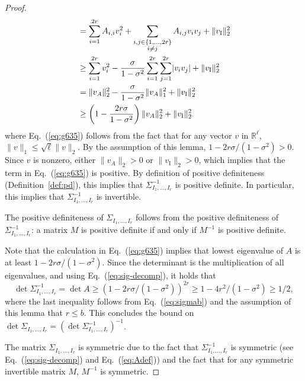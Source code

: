 \documentclass[final, 12pt]{colt2018}
\renewcommand{\eqref}[1]{Eq.~(\ref{#1})}
\begin{document}
\begin{proof}
\begin{align}
&=\sum_{i=1}^{2r} A_{i,i} v_i^2 + \sum_{\substack {i,j \in \{1,\dots,2r\} \\ i \ne j}} A_{i,j} v_i v_j + \lVert v_{\mathrm{I}} \rVert_2^2 \notag \\
&\ge \sum_{i=1}^{2r} v_i^2 - \frac{\sigma}{1-\sigma^2}\sum_{i=1}^{2r} \sum_{j=1}^{2r} \lvert v_i v_j \rvert + \lVert v_{\mathrm{I}} \rVert_2^2 \notag \\
&= \lVert v_A \rVert_2^2 - \frac{\sigma}{1-\sigma^2} \lVert v_A \rVert_1^2 + \lVert v_{\mathrm{I}} \rVert_2^2 \notag \\
&\ge \left(1 - \frac{2r \sigma}{1-\sigma^2} \right) \lVert v_A \rVert_2^2+ \lVert v_{\mathrm{I}} \rVert_2^2 \label{eq:g635} 
\end{align}
where \eqref{eq:g635} follows from the fact that for any vector $v$ in $\mathbb{R}^\ell$, $\lVert v \rVert_1 \le \sqrt{\ell} \lVert v \rVert_2$. By the assumption of this lemma, $1 - 2 r \sigma / (1-\sigma^2) > 0$. Since $v$ is nonzero, either $\lVert v_A \rVert_2 > 0$ or $\lVert v_{\mathrm{I}} \rVert_2 >0$, which implies that the term in \eqref{eq:g635} is positive. By definition of positive definiteness (Definition~\ref{def:pd}), this implies that $\Sigma_{I_1,\dots,I_r}^{-1}$ is positive definite. In particular, this implies that $\Sigma_{I_1,\dots,I_r}^{-1}$ is invertible. 

The positive definiteness of $\Sigma_{I_1,\dots,I_r}$ follows from the positive definiteness of $\Sigma_{I_1,\dots,I_r}^{-1}$: a matrix $M$ is positive definite if and only if $M^{-1}$ is positive definite.

Note that the calculation in \eqref{eq:g635} implies that lowest eigenvalue of $A$ is at least $1 - 2r\sigma/\left(1-\sigma^2\right)$. Since the determinant is the multiplication of all eigenvalues, and using \eqref{eq:sig-decomp}, it holds that
\[
\det \Sigma_{I_1,\dots, I_r}^{-1}
= \det A
\ge \left(1 - 2r\sigma/\left(1-\sigma^2\right)\right)^{2r}
\ge 1 - 4r^2 /\left(1-\sigma^2\right)
\ge 1/2,
\]
where the last inequality follows from \eqref{eq:sigmab} and the assumption of this lemma that $r \le b$. This concludes the bound on $\det \Sigma_{I_1,\dots,I_r} = \left(\det \Sigma_{I_1,\dots,I_r}^{-1}\right)^{-1}$.

The matrix $\Sigma_{I_1,\dots,I_r}$ is symmetric due to the fact that $\Sigma_{I_1,\dots,I_r}^{-1}$ is symmetric (see \eqref{eq:sig-decomp} and \eqref{eq:Adef}) and the fact that for any symmetric invertible matrix $M$, $M^{-1}$ is symmetric.


\end{proof}
\end{document}
